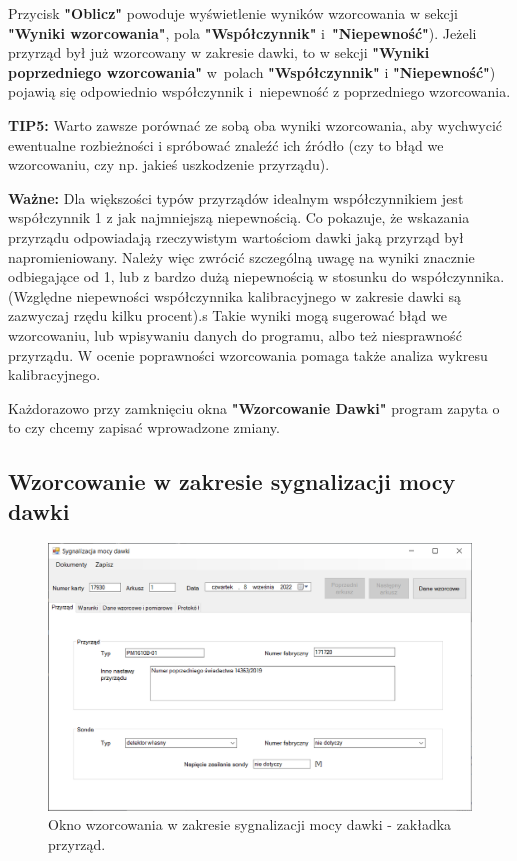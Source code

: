 Przycisk \textbf{"Oblicz"} powoduje wyświetlenie wyników wzorcowania w sekcji \textbf{"Wyniki wzorcowania"}, pola \textbf{"Współczynnik"} i~\textbf{"Niepewność"}). Jeżeli przyrząd był już wzorcowany w zakresie dawki, to w sekcji \textbf{"Wyniki poprzedniego wzorcowania"} w~polach \textbf{"Współczynnik"} i \textbf{"Niepewność"}) pojawią się odpowiednio współczynnik i~niepewność z poprzedniego wzorcowania. 

\textbf{TIP5:} Warto zawsze porównać ze sobą oba wyniki wzorcowania, aby wychwycić ewentualne rozbieżności i spróbować znaleźć ich źródło (czy to błąd we wzorcowaniu, czy np. jakieś uszkodzenie przyrządu).

\textbf{Ważne:} Dla większości typów przyrządów idealnym współczynnikiem jest współczynnik 1 z jak najmniejszą niepewnością. Co pokazuje, że wskazania przyrządu odpowiadają rzeczywistym wartościom dawki jaką przyrząd był napromieniowany. Należy więc zwrócić szczególną uwagę na wyniki znacznie odbiegające od 1, lub z bardzo dużą niepewnością w stosunku do współczynnika. (Względne niepewności współczynnika kalibracyjnego w zakresie dawki są zazwyczaj rzędu kilku procent).s Takie wyniki mogą sugerować błąd we wzorcowaniu, lub wpisywaniu danych do programu, albo też niesprawność przyrządu. W ocenie poprawności wzorcowania pomaga także analiza wykresu kalibracyjnego.

Każdorazowo przy zamknięciu okna \textbf{"Wzorcowanie Dawki"} program zapyta o to czy chcemy zapisać wprowadzone zmiany.

\subsection{Wzorcowanie w zakresie sygnalizacji mocy dawki}
\label{wzorcowanie_syg_moc}
		
	\begin{figure}[H]
		\centering
		\includegraphics[width=\columnwidth]{obrazki/Wzorcowanie/syg_mocy_dawki/przyrzad.png}
		\caption{Okno wzorcowania w zakresie sygnalizacji mocy dawki - zakładka przyrząd.}
		\label{sygMocyPrzyrzad}
	\end{figure}

